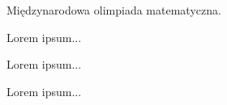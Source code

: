 Międzynarodowa olimpiada matematyczna.



\begin{exercise}[1/1960] Lorem ipsum... \end{exercise}

\begin{exercise}[1/1961] Lorem ipsum... \end{exercise}

\begin{exercise}[1/1962] Lorem ipsum... \end{exercise}

